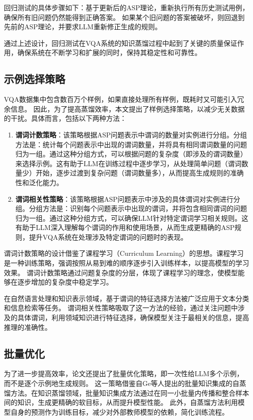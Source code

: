 回归测试的具体步骤如下：基于更新后的ASP理论，重新执行所有历史测试用例，确保所有旧问题仍然能得到正确答案。
如果某个旧问题的答案被破坏，则回退到先前的ASP理论，并要求LLM重新修正生成的规则。

通过上述设计，回归测试在VQA系统的知识蒸馏过程中起到了关键的质量保证作用，确保系统在不断学习和扩展的同时，保持其稳定性和可靠性。
\subsection{示例选择策略}
VQA数据集中包含数百万个样例，如果直接处理所有样例，既耗时又可能引入冗余信息。
因此，为了提高蒸馏效率，本文提出了样例选择策略，以减少无关数据的干扰。具体而言，包括以下两种方法：
\begin{enumerate}[itemsep=0pt,parsep=0pt]
\item \textbf{谓词计数策略}：该策略根据ASP问题表示中谓词的数量对实例进行分组。​分组方法是：​统计每个问题表示中出现的谓词数量，并将具有相同谓词数量的问题归为一组。​​通过这种分组方式，可以根据问题的复杂度（即涉及的谓词数量）来选择示例。
​这有助于LLM在训练过程中逐步学习，从处理简单问题（谓词数量少）开始，逐步过渡到复杂问题（谓词数量多），从而提高生成规则的准确性和泛化能力。
\item \textbf{谓词相关性策略}：该策略根据ASP问题表示中涉及的具体谓词对实例进行分组。分组方法是：​识别每个问题表示中出现的谓词，并将包含相同谓词的问题归为一组。​
通过这种分组方式，可以确保LLM针对特定谓词学习相关规则。​这有助于LLM深入理解每个谓词的作用和使用场景，从而生成更精确的ASP规则，提升VQA系统在处理涉及特定谓词的问题时的表现。
\end{enumerate}

谓词计数策略的设计借鉴了课程学习（Curriculum Learning）的思想。
​课程学习是一种训练策略，强调按照从易到难的顺序逐步引入训练样本，以提高模型的学习效果。
谓词计数策略通过问题复杂度的分层，体现了课程学习的理念，使模型能够在逐步增加的复杂度中稳定学习。

​在自然语言处理和知识表示领域，基于谓词的特征选择方法被广泛应用于文本分类和信息检索等任务。
谓词相关性策略吸取了这一方法的经验，通过关注问题中涉及的具体谓词，利用领域知识进行特征选择，确保模型关注于最相关的信息，提高推理的准确性。
\subsection{批量优化}
为了进一步提高效率，论文还提出了批量优化策略，即一次性给LLM多个示例，而不是逐个示例地生成规则。
这一策略借鉴自Ge\cite{ge2021selfdistillationbatchknowledgeensembling}等人提出的批量知识集成的自蒸馏方法。
​在知识蒸馏领域，批量知识集成方法通过在同一小批量内传播和整合样本间的知识，生成更精确的软目标，从而提升模型性能。
此外，自蒸馏方法利用模型自身的预测作为训练目标，减少对外部教师模型的依赖，简化训练流程。

